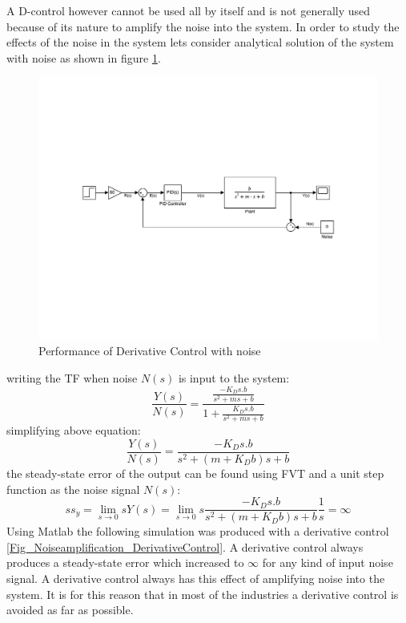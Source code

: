 A D-control however cannot be used all by itself and is not generally used because of its nature to amplify the noise into the system. In order to study the effects of the noise in the system lets consider analytical solution of the system with noise as shown in figure \ref{Fig_NoiseDerivativeControl}.
\begin{figure}[h!]
	\centering
	\includegraphics[width=\linewidth]{Bilder/NoiseDerivativeControl.pdf}
	\caption{Performance of Derivative Control with noise}
	\label{Fig_NoiseDerivativeControl}
\end{figure}
writing the TF when noise $N(s)$ is input to the system:
\begin{equation}
	\frac{Y(s)}{N(s)} = \frac{\frac{- K_D s . b}{s^2 + ms + b}}{1 + \frac{K_D s . b}{s^2 + ms + b}}
\end{equation}
simplifying above equation:
\begin{equation}
	\frac{Y(s)}{N(s)} = \frac{- K_D s . b}{s^2 + (m + K_D b)s + b}
\end{equation}
the steady-state error of the output can be found using FVT and a unit step function as the noise signal $N(s)$:
\begin{equation} \label{Eq_UnderstandingPID_D_noise}
	ss_{y} = \lim_{s\to 0} s Y(s) = \lim_{s\to 0} s \frac{- K_D s . b}{s^2 + (m + K_D b)s + b} \frac{1}{s} = \infty
\end{equation}
Using Matlab the following simulation was produced with a derivative control \ref{Fig_Noiseamplification_DerivativeControl}. A derivative control always produces a steady-state error which increased to $\infty$ for any kind of input noise signal. A derivative control always has this effect of amplifying noise into the system. It is for this reason that in most of the industries a derivative control is avoided as far as possible.
